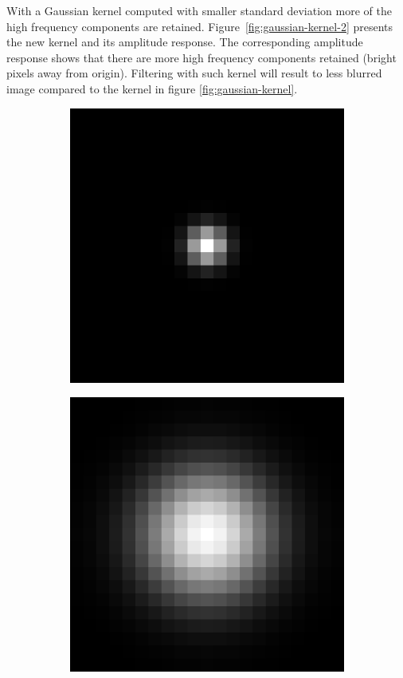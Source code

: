 \documentclass[]{article}
\begin{document}
With a Gaussian kernel computed with smaller standard deviation more of the high
frequency components are retained. Figure~\ref{fig:gaussian-kernel-2} presents
the new kernel and its amplitude response. The corresponding amplitude response
shows that there are more high frequency components retained (bright pixels away
from origin). Filtering with such kernel will result to less blurred image
compared to the kernel in figure \ref{fig:gaussian-kernel}.
\begin{figure}
  \centering
    \begin{subfigure}[t]{0.49\textwidth}
      \centering
      \includegraphics[width=0.99\linewidth]{kernel2.png}
    \end{subfigure}
    \begin{subfigure}[t]{0.49\textwidth}
      \centering
      \includegraphics[width=0.99\linewidth]{freq2.png}

\end{subfigure}
\end{figure}
\end{document}
